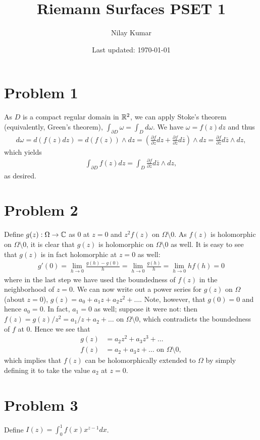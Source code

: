 \documentclass{../../mathnotes}
\title{Riemann Surfaces PSET 1}
\author{Nilay Kumar}
\date{Last updated: \today}
\begin{document}
\maketitle

\section*{Problem 1}

As $D$ is a compact regular domain in $\mathbb{R}^2$, we can apply Stoke's theorem (equivalently, Green's theorem), $\int_{\partial D}\omega=\int_Dd\omega$.
We have $\omega=f(z)dz$ and thus
\begin{align*}
    d\omega=d(f(z)dz)=d(f(z))\wedge dz=\left( \frac{\partial f}{\partial z}dz+\frac{\partial f}{\partial \bar z}d\bar z \right)\wedge dz=\frac{\partial f}{\partial \bar z}d\bar z\wedge dz,
\end{align*}
which yields
\begin{align*}
    \int_{\partial D}f(z)dz=\int_{D}\frac{\partial f}{\partial \bar z}d\bar z\wedge dz,
\end{align*}
as desired.



\section*{Problem 2}

Define $g(z):\Omega\to\mathbb{C}$ as $0$ at $z=0$ and $z^2f(z)$ on $\Omega\setminus 0$. As $f(z)$ is holomorphic on $\Omega\setminus0$, it is clear that
$g(z)$ is holomorphic on $\Omega\setminus0$ as well. It is easy to see that $g(z)$ is in fact holomorphic at $z=0$ as well:
\begin{align*}
    g'(0)=\lim_{h\to 0}\frac{g(h)-g(0)}{h}=\lim_{h\to 0}\frac{g(h)}{h}=\lim_{h\to 0}hf(h)=0
\end{align*}
where in the last step we have used the boundedness of $f(z)$ in the neighborhood of $z=0$. We can now write out a power series for $g(z)$
on $\Omega$ (about $z=0$), $g(z)=a_0+a_1z+a_2z^2+\ldots$. Note, however, that $g(0)=0$ and hence $a_0=0$. In fact, $a_1=0$ as well; suppose it were
not: then $f(z)=g(z)/z^2=a_1/z+a_2+\ldots$ on $\Omega\setminus0$, which contradicts the boundedness of $f$ at 0. Hence we see that 
\begin{align*}
    g(z)&=a_2z^2+a_3z^3+\ldots\\
    f(z)&=a_2+a_3z+\ldots\text{ on } \Omega\setminus0,
\end{align*}
which implies that $f(z)$ can be holomorphically extended to $\Omega$ by simply defining it to take the value $a_2$ at $z=0$.


\section*{Problem 3}

Define $I(z)=\int_0^1 f(x)x^{z-1}dx$. 
\end{document}
